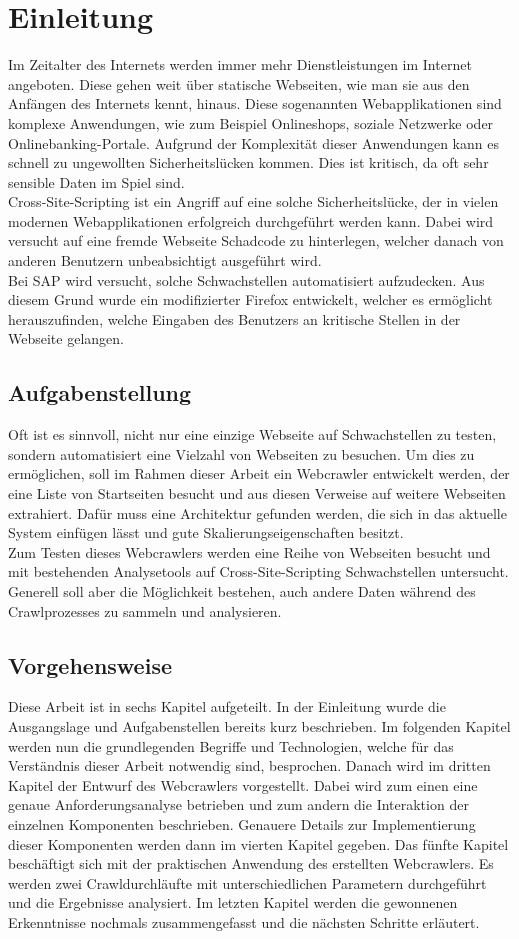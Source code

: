 \chapter{Einleitung}
\cite{myid}
Im Zeitalter des Internets werden immer mehr Dienstleistungen im Internet angeboten. Diese gehen weit über statische Webseiten, wie man sie aus den Anfängen des Internets kennt, hinaus. Diese sogenannten Webapplikationen sind komplexe Anwendungen, wie zum Beispiel Onlineshops, soziale Netzwerke oder Onlinebanking-Portale. Aufgrund der Komplexität dieser Anwendungen kann es schnell zu ungewollten Sicherheitslücken kommen. Dies ist kritisch, da oft sehr sensible Daten im Spiel sind. \\
Cross-Site-Scripting ist ein Angriff auf eine solche Sicherheitslücke, der in vielen modernen Webapplikationen erfolgreich durchgeführt werden kann. Dabei wird versucht auf eine fremde Webseite Schadcode zu hinterlegen, welcher danach von anderen Benutzern unbeabsichtigt ausgeführt wird. \\
Bei SAP wird versucht, solche Schwachstellen automatisiert aufzudecken. Aus diesem Grund wurde ein modifizierter Firefox entwickelt, welcher es ermöglicht herauszufinden, welche Eingaben des Benutzers an kritische Stellen in der Webseite gelangen.
\section{Aufgabenstellung}
Oft ist es sinnvoll, nicht nur eine einzige Webseite auf Schwachstellen zu testen, sondern automatisiert eine Vielzahl von Webseiten zu besuchen. Um dies zu ermöglichen, soll im Rahmen dieser Arbeit ein Webcrawler entwickelt werden, der eine Liste von Startseiten besucht und aus diesen Verweise auf weitere Webseiten extrahiert. Dafür muss eine Architektur gefunden werden, die sich in das aktuelle System einfügen lässt und gute Skalierungseigenschaften besitzt. \\
Zum Testen dieses Webcrawlers werden eine Reihe von Webseiten besucht und mit bestehenden Analysetools auf Cross-Site-Scripting Schwachstellen untersucht. Generell soll aber die Möglichkeit bestehen, auch andere Daten während des Crawlprozesses zu sammeln und analysieren.
\section{Vorgehensweise}
Diese Arbeit ist in sechs Kapitel aufgeteilt. In der Einleitung wurde die Ausgangslage und Aufgabenstellen bereits kurz beschrieben. Im folgenden Kapitel werden nun die grundlegenden Begriffe und Technologien, welche für das Verständnis dieser Arbeit notwendig sind, besprochen. Danach wird im dritten Kapitel der Entwurf des Webcrawlers vorgestellt. Dabei wird zum einen eine genaue Anforderungsanalyse betrieben und zum andern die Interaktion der einzelnen Komponenten beschrieben. Genauere Details zur Implementierung dieser Komponenten werden dann im vierten Kapitel gegeben. Das fünfte Kapitel beschäftigt sich mit der praktischen Anwendung des erstellten Webcrawlers. Es werden zwei Crawldurchläufte mit unterschiedlichen Parametern durchgeführt und die Ergebnisse analysiert. Im letzten Kapitel werden die gewonnenen Erkenntnisse nochmals zusammengefasst und die nächsten Schritte erläutert.
